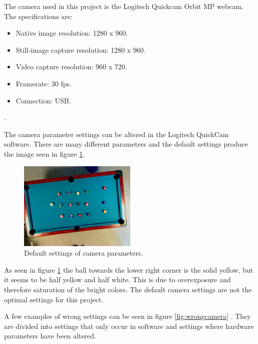 The camera used in this project is the Logitech Quickcam Orbit MP webcam. The specifications are:

\begin{itemize}
\setlength{\itemsep}{0mm}
	\item Native image resolution: 1280 x 960.
	\item Still-image capture resolution: 1280 x 960.
	\item Video capture resolution: 960 x 720.
	\item Framerate: 30 fps.
	\item Connection: USB.
\end{itemize}.

The camera parameter settings can be altered in the Logitech QuickCam software. There are many different parameters and the default settings produce the image seen in figure \ref{fig:defaultcamera}.

\begin{figure}[htpb]
\begin{center}
\leavevmode
\includegraphics[width=0.5\textwidth]{images/default}
\end{center}
\caption{Default settings of camera parameters.}
\label{fig:defaultcamera}
\end{figure} 
	
As seen in figure \ref{fig:defaultcamera} the ball towards the lower right corner is the solid yellow, but it seems to be half yellow and half white. This is due to overexposure and therefore saturation of the bright colors. The default camera settings are not the optimal settings for this project.	

A few examples of wrong settings can be seen in figure \ref{fig:wrongcamera} . They are divided into settings that only occur in software and settings where hardware parameters have been altered.


